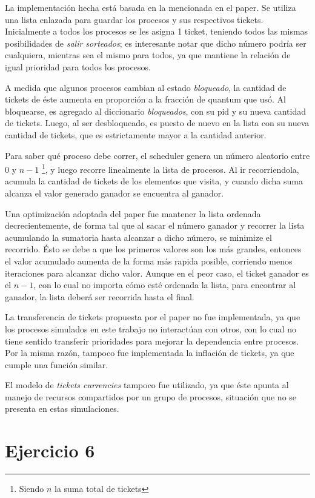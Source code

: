 \documentclass[a4paper]{article}
\begin{document}
La implementación hecha está basada en la mencionada en el paper. Se utiliza
una lista enlazada para guardar los procesos y sus respectivos tickets.
Inicialmente a todos los procesos se les asigna 1 ticket, teniendo todos las
mismas posibilidades de \textit{salir sorteados}; es interesante notar que
dicho número podría ser cualquiera, mientras sea el mismo para todos, ya que
mantiene la relación de igual prioridad para todos los procesos.

A medida que algunos procesos cambian al estado \textit{bloqueado}, la
cantidad de tickets de éste aumenta en proporción a la fracción de quantum que usó. Al
bloquearse, es agregado al diccionario \textit{bloqueados}, con su pid y
su nueva cantidad de tickets. Luego, al ser desbloqueado, es puesto de nuevo
en la lista con su nueva cantidad de tickets, que es estrictamente mayor a
la cantidad anterior.

Para saber qué proceso debe correr, el scheduler genera un número
aleatorio entre $0$ y $n-1$ \footnote{Siendo $n$ la suma total de tickets}, y luego recorre linealmente la lista de
procesos. Al ir recorriendola, acumula la cantidad de tickets de los
elementos que visita, y cuando dicha suma alcanza el valor generado
ganador se encuentra al ganador.

Una optimización adoptada del paper fue mantener la lista ordenada
decrecientemente, de forma tal que al sacar el número ganador y recorrer la
lista acumulando la sumatoria hasta alcanzar a dicho número, se minimize el
recorrido. Ésto se debe a que los primeros valores son los más grandes,
entonces el valor acumulado aumenta de la forma más rapida posible,
corriendo menos iteraciones para alcanzar dicho valor. Aunque en el peor
caso, el ticket ganador es el $n-1$, con lo cual no importa cómo esté
ordenada la lista, para encontrar al ganador, la lista deberá ser recorrida
hasta el final.

La transferencia de tickets propuesta por el paper no fue implementada, ya que
los procesos simulados en este trabajo no interactúan con otros, con lo cual
no tiene sentido transferir prioridades para mejorar la dependencia entre
procesos. Por la misma razón, tampoco fue implementada la inflación de
tickets, ya que cumple una función similar.

El modelo de \textit{tickets currencies} tampoco fue utilizado, ya que
éste apunta al manejo de recursos compartidos por un grupo de procesos,
situación que no se presenta en estas simulaciones.

\section{Ejercicio 6}
\end{document}
